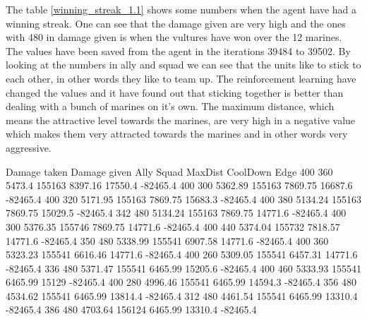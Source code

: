 The table \ref{winning_streak_1.1} shows some numbers when the agent have had a winning streak. One can see that the damage given are very high and the ones with 480 in damage given is when the vultures have won over the 12 marines. The values have been saved from the agent in the iterations 39484 to 39502. By looking at the numbers in ally and squad we can see that the units like to stick to each other, in other words they like to team up. The reinforcement learning have changed the values and it have found out that sticking together is better than dealing with a bunch of marines on it's own. The maximum distance, which means the attractive level towards the marines, are very high in a negative value which makes them very attracted towards the marines and in other words very aggressive. 









Damage taken	Damage given	Ally	Squad	MaxDist	CoolDown	Edge
400	360	5473.4	155163	8397.16	17550.4	-82465.4
400	300	5362.89	155163	7869.75	16687.6	-82465.4
400	320	5171.95	155163	7869.75	15683.3	-82465.4
400	380	5134.24	155163	7869.75	15029.5	-82465.4
342	480	5134.24	155163	7869.75	14771.6	-82465.4
400	300	5376.35	155746	7869.75	14771.6	-82465.4
400	440	5374.04	155732	7818.57	14771.6	-82465.4
350	480	5338.99	155541	6907.58	14771.6	-82465.4
400	360	5323.23	155541	6616.46	14771.6	-82465.4
400	260	5309.05	155541	6457.31	14771.6	-82465.4
336	480	5371.47	155541	6465.99	15205.6	-82465.4
400	460	5333.93	155541	6465.99	15129	-82465.4
400	280	4996.46	155541	6465.99	14594.3	-82465.4
356	480	4534.62	155541	6465.99	13814.4	-82465.4
312	480	4461.54	155541	6465.99	13310.4	-82465.4
386	480	4703.64	156124	6465.99	13310.4	-82465.4









